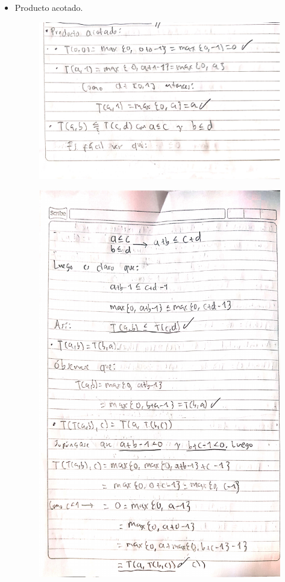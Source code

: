 \documentclass[fleqn]{article}
\begin{document}
\begin{enumerate}
\begin{itemize}
       \item Producto acotado.
       \begin{figure}[H]
         \centering
         \includegraphics[scale=.5]{figs/2b1}
       \end{figure}
       \begin{figure}[H]
         \centering
         \includegraphics[scale=.8]{figs/2b2}

\end{figure}
\end{itemize}
\end{enumerate}
\end{document}
